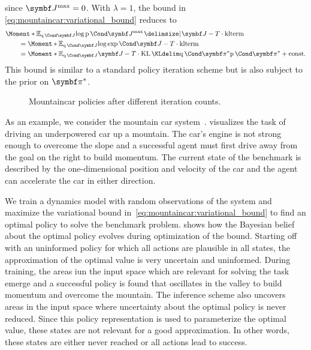 since $\mat{J}^\text{max} = 0$.
With $\lambda = 1$, the bound in \cref{eq:mountaincar:variational_bound} reduces to
\begin{align}
    \begin{split}
        \MoveEqLeft\Moment*{\E_{\Variat{\mat{J}}}}{\log \Prob{\mat{J}^{\text{max}} \given \mat{J}}} - T \cdot \text{klterm}
        \\
        &= \Moment*{\E_{\Variat{\mat{J}}}}{\log \Fun{\exp}{\mat{J}}} - T \cdot \text{klterm}
        \\
        &= \Moment*{\E_{\Variat{\mat{J}}}}{\mat{J}} - T \cdot \KL{\Variat{\mat{\pi}^\ast}}{\Prob{\mat{\pi}^\ast}} + \text{const}.
    \end{split}
\end{align}
This bound is similar to a standard policy iteration scheme but is also subject to the prior on $\mat{\pi}^\ast$.

\begin{figure}[tp]
    \centering
    
    
    
    \caption{
        \label{fig:mountaincar:policy}
        Mountaincar policies after different iteration counts.
    }
\end{figure}
As an example, we consider the mountain car system~\parencite{moore_efficient_1990,sutton_reinforcement_2018}.
 visualizes the task of driving an underpowered car up a mountain.
The car's engine is not strong enough to overcome the slope and a successful agent must first drive away from the goal on the right to build momentum.
The current state of the benchmark is described by the one-dimensional position and velocity of the car and the agent can accelerate the car in either direction.

We train a dynamics model with random observations of the system and maximize the variational bound in~\cref{eq:mountaincar:variational_bound} to find an optimal policy to solve the benchmark problem.
 shows how the Bayesian belief about the optimal policy evolves during optimization of the bound.
Starting off with an uninformed policy for which all actions are plausible in all states, the approximation of the optimal value is very uncertain and uninformed.
During training, the areas iun the input space which are relevant for solving the task emerge and a successful policy is found that oscillates in the valley to build momentum and overcome the mountain.
The inference scheme also uncovers areas in the input space where uncertainty about the optimal policy is never reduced.
Since this policy representation is used to parameterize the optimal value, these states are not relevant for a good approximation.
In other words, these states are either never reached or all actions lead to success.


